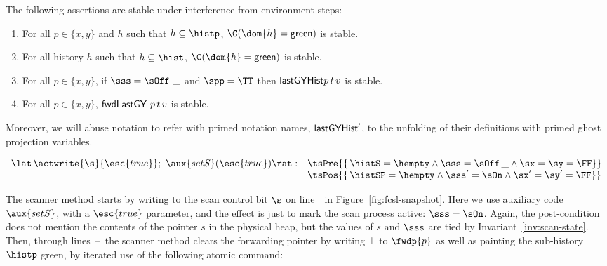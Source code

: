 \begin{lemma}\label{lem:menvs-scan}
The following assertions are stable under interference from
environment steps:
\begin{enumerate}
 \item \label{lem:menvs:green-phist} For all $p \in \{ x, y \}$ and
   $h$ such that $ h \subseteq \histp $, $ \C(\dom{h} =
   \mathsf{green})$ is stable.

 \item\label{lem:menvs:green-subhist} For all history $h$ such that $ h
   \subseteq \hist$, $\C(\dom{h} = \sf{green})$ is stable.

 \item \label{lem:menvs:some-lgVy} For all $p \in \{x, y \}$, if $\sss
   = \sOff\ \_$ and $\spp = \TT$ then ${\mathsf{lastGYHist}} p\, t\, v$ is stable.

 \item \label{lem:menvs:none-lgVy} For all $p \in \{x, y\}$,
   ${\mathsf{fwdLastGY}}\ p\, t\, v$ is stable.
\end{enumerate}
Moreover, we will abuse notation to refer with primed notation names,
\eg ${\mathsf{lastGYHist}}'$, to the unfolding of their definitions with primed
ghost projection variables.
\end{lemma}






\[
\!\begin{array}{r l}
  \lat\,\actwrite{\s}{\esc{true}};\ \aux{setS}(\esc{true}) \rat: &
     \tsPre{\{\, \histS = \hempty \wedge
       \sss = \sOff\, \_ \wedge \sx = \sy = \FF \}} \\
     & \tsPos{\{\, \histSP = \hempty \wedge
       \sss' = \sOn \wedge \sx' = \sy' = \FF \}}
\end{array}
\]

The scanner method starts by writing to the scan control bit $\s$ on
line~\lineScanSetsS\ in Figure~\ref{fig:fcsl-snapshot}. Here we use
auxiliary code $\aux{setS}$, with a $\esc{true}$ parameter, and the
effect is just to mark the scan process active: $\sss = \sOn$. Again,
the post-condition does not mention the contents of the pointer $s$ in
the physical heap, but the values of $s$ and $\sss$ are tied by
Invariant~\ref{inv:scan-state}. Then, through
lines~\lineScanClearsX--\lineScanClearsY~the scanner method clears the
forwarding pointer by writing $\bot$ to $\fwdp{p}$ as well as painting
the sub-history $\histp$ green, by iterated use of the following
atomic command:

